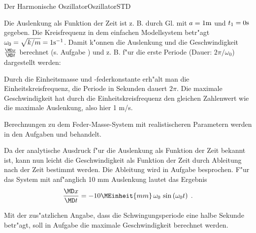 \begin{MXContent}{Der Harmonische Oszillator}{Oszillator}{STD}
\begin{MExample}
\begin{center}
  \end{center}

Die Auslenkung als Funktion der Zeit ist z. B. durch Gl.  mit $a=1\mathrm{m}$ und $t_1 = 0\mathrm{s}$ gegeben. Die Kreisfrequenz in dem einfachen Modellsystem betr"agt $\omega_0=\sqrt{k/m}=1\mathrm{s^{-1}}$. Damit k"onnen die Auslenkung und die Geschwindigkeit $\frac{\MD x}{\MD t}$ berechnet (s. Aufgabe ) und z. B.
f"ur die erste Periode (Dauer: $2\pi/\omega_0$) dargestellt werden:

\begin{center}
  \end{center}

Durch die Einheitsmasse und -federkonstante erh"alt man die Einheitskreisfrequenz, die Periode in Sekunden dauert $2\pi$. Die maximale Geschwindigkeit hat durch die Einheitskreisfrequenz den gleichen Zahlenwert wie die maximale Auslenkung, also hier 1 m/s.

\end{MExample}

Berechnungen zu dem Feder-Masse-System mit realistischeren Parametern werden in den Aufgaben 
und
behandelt.

Da der analytische Ausdruck f"ur die Auslenkung als Funktion der Zeit bekannt ist, kann nun leicht die Geschwindigkeit als Funktion der Zeit durch Ableitung nach der Zeit bestimmt werden. Die Ableitung wird in Aufgabe  besprochen. F"ur das System mit anf"anglich 10 mm Auslenkung lautet das Ergebnis
\begin{equation}
  \frac{\MD x }{\MD t} = -10\MEinheit{mm}\,\omega_0\,\sin\left(\omega_0t\right)\; .
\end{equation}

Mit der zus"atzlichen Angabe, dass die Schwingungsperiode eine halbe Sekunde betr"agt, soll in Aufgabe
die maximale Geschwindigkeit berechnet werden.



\end{MXContent}
